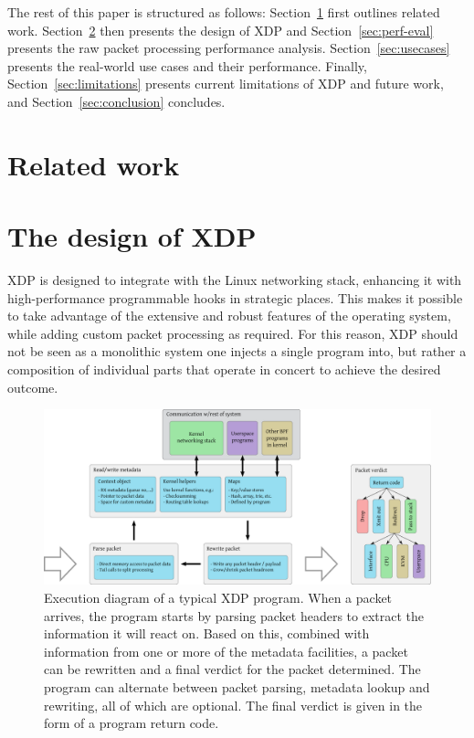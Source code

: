 \documentclass[10pt,sigconf]{acmart}
\begin{document}
The rest of this paper is structured as follows: Section~\ref{sec:related-work}
first outlines related work. Section~\ref{sec:design} then presents the design
of XDP and Section~\ref{sec:perf-eval} presents the raw packet processing
performance analysis. Section~\ref{sec:usecases} presents the real-world use
cases and their performance. Finally, Section~\ref{sec:limitations} presents
current limitations of XDP and future work, and Section~\ref{sec:conclusion}
concludes.

\section{Related work}%
\label{sec:related-work}
\section{The design of XDP}
\label{sec:design}
XDP is designed to integrate with the Linux networking stack, enhancing it with
high-performance programmable hooks in strategic places. This makes it possible
to take advantage of the extensive and robust features of the operating system,
while adding custom packet processing as required. For this reason, XDP should
not be seen as a monolithic system one injects a single program into, but rather
a composition of individual parts that operate in concert to achieve the desired
outcome.

\begin{figure}[t]
\centering
\includegraphics[width=\linewidth]{figures/xdp-execution-diagram.pdf}
\caption{\label{fig:xdp-execution} Execution diagram of a typical XDP program.
  When a packet arrives, the program starts by parsing packet headers to extract
  the information it will react on. Based on this, combined with information
  from one or more of the metadata facilities, a packet can be rewritten and a
  final verdict for the packet determined. The program can alternate between
  packet parsing, metadata lookup and rewriting, all of which are optional. The
  final verdict is given in the form of a program return code.}
\end{figure}
\end{document}
